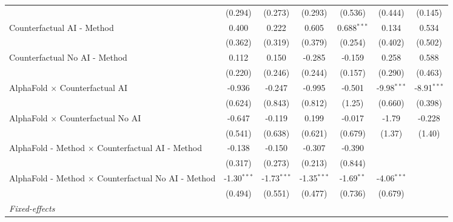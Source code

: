 \begin{tabular}{lcccccc}
                                                              & (0.294)       & (0.273)       & (0.293)       & (0.536)       & (0.444)       & (0.145)\\   
   Counterfactual AI - Method                                 & 0.400         & 0.222         & 0.605         & 0.688$^{***}$ & 0.134         & 0.534\\   
                                                              & (0.362)       & (0.319)       & (0.379)       & (0.254)       & (0.402)       & (0.502)\\   
   Counterfactual No AI - Method                              & 0.112         & 0.150         & -0.285        & -0.159        & 0.258         & 0.588\\   
                                                              & (0.220)       & (0.246)       & (0.244)       & (0.157)       & (0.290)       & (0.463)\\   
   AlphaFold $\times$ Counterfactual AI                       & -0.936        & -0.247        & -0.995        & -0.501        & -9.98$^{***}$ & -8.91$^{***}$\\   
                                                              & (0.624)       & (0.843)       & (0.812)       & (1.25)        & (0.660)       & (0.398)\\   
   AlphaFold $\times$ Counterfactual No AI                    & -0.647        & -0.119        & 0.199         & -0.017        & -1.79         & -0.228\\   
                                                              & (0.541)       & (0.638)       & (0.621)       & (0.679)       & (1.37)        & (1.40)\\   
   AlphaFold - Method $\times$ Counterfactual AI - Method     & -0.138        & -0.150        & -0.307        & -0.390        &               &   \\   
                                                              & (0.317)       & (0.273)       & (0.213)       & (0.844)       &               &   \\   
   AlphaFold - Method $\times$ Counterfactual No AI - Method  & -1.30$^{***}$ & -1.73$^{***}$ & -1.35$^{***}$ & -1.69$^{**}$  & -4.06$^{***}$ &   \\   
                                                              & (0.494)       & (0.551)       & (0.477)       & (0.736)       & (0.679)       &   \\   
   \midrule
   \emph{Fixed-effects}\\

\end{tabular}

